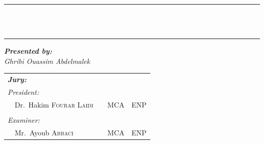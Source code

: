 {\begin{titlepage}
    \vspace{5mm}

    \center


    \vspace{2mm}


    \vspace{2mm}


    \vspace{5mm}

    \begin{bfseries}
        \rule{\linewidth}{1pt} \\
        \vspace{5mm}
         \\
        \vspace{5mm}
        \rule{\linewidth}{1pt}
    \end{bfseries}

    \begin{flushleft}
        \textit{\textbf{Presented by:}}      \\
        \textit{Ghribi Ouassim Abdelmalek} \\
    \end{flushleft}

    \begin{flushleft}
        \noindent \large
        \begin{tabular}{llcll}
            \textit{\textbf{Jury:}}                                &  &             &                    \\
            \textit{President:}                                    &  &             &                    \\
            \multicolumn{2}{l}{~~Dr.\ Hakim \textsc{Fourar Laidi}} &  & MCA         & ENP                \\

            \\
            \textit{Examiner:}                                     &  &             &                    \\
            \multicolumn{2}{l}{~~Mr.\ Ayoub \textsc{Abbaci}}       &  & MCA         & ENP                \\


\end{tabular}
\end{flushleft}
\end{titlepage}}
